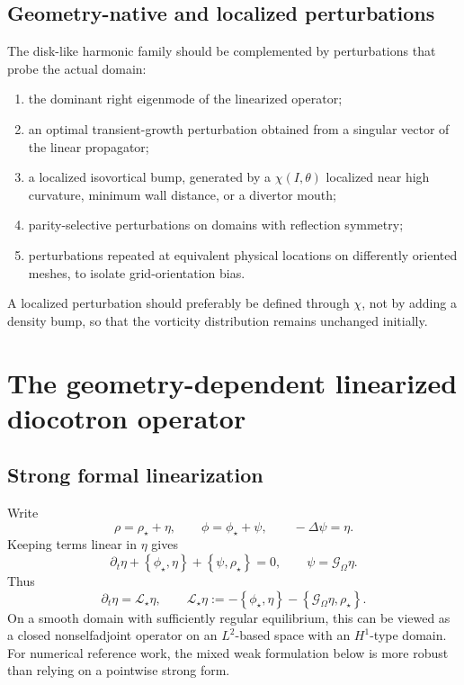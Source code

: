 \documentclass[11pt,a4paper]{article}
\newcommand{\Om}{\Omega}
\newcommand{\bracket}[2]{\left\{#1,#2\right\}}
\newcommand{\G}{\mathcal{G}_{\Om}}
\newcommand{\Lop}{\mathcal{L}_{\star}}
\begin{document}
\subsection{Geometry-native and localized perturbations}

The disk-like harmonic family should be complemented by perturbations that probe the actual domain:
\begin{enumerate}
  \item the dominant right eigenmode of the linearized operator;
  \item an optimal transient-growth perturbation obtained from a singular vector of the linear propagator;
  \item a localized isovortical bump, generated by a $\chi(I,\theta)$ localized near high curvature, minimum wall distance, or a divertor mouth;
  \item parity-selective perturbations on domains with reflection symmetry;
  \item perturbations repeated at equivalent physical locations on differently oriented meshes, to isolate grid-orientation bias.
\end{enumerate}
A localized perturbation should preferably be defined through $\chi$, not by adding a density bump, so that the vorticity distribution remains unchanged initially.

\section{The geometry-dependent linearized diocotron operator}

\subsection{Strong formal linearization}

Write
\[
  \rho=\rho_\star+\eta,
  \qquad
  \phi=\phi_\star+\psi,
  \qquad
  -\Delta\psi=\eta.
\]
Keeping terms linear in $\eta$ gives
\begin{equation}
  \partial_t\eta
  +\bracket{\phi_\star}{\eta}
  +\bracket{\psi}{\rho_\star}
  =0,
  \qquad
  \psi=\G\eta.
  \label{eq:linearized}
\end{equation}
Thus
\begin{equation}
  \partial_t\eta=\Lop\eta,
  \qquad
  \Lop\eta
  :=-\bracket{\phi_\star}{\eta}
     -\bracket{\G\eta}{\rho_\star}.
  \label{eq:linear-operator}
\end{equation}
On a smooth domain with sufficiently regular equilibrium, this can be viewed as a closed nonselfadjoint operator on an $L^2$-based space with an $H^1$-type domain. For numerical reference work, the mixed weak formulation below is more robust than relying on a pointwise strong form.
\end{document}
